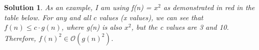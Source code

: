 \documentclass[11pt]{article}
\newtheorem*{solution}{Solution}
\begin{document}
\begin{enumerate}
\begin{solution}
	As an example, I am using f(n) = $x^2$ as demonstrated in red in the table below. 
	For any and all $c$ values (x values), we can see that $f(n) \leq c \cdot g(n)$, where g(n) is also $x^2$, but the c values are 3 and 10.
	Therefore, $f(n)^2 \in \mathcal{O}(g(n)^2)$. 
	\begin{center}
\end{center}
\end{solution}
\end{enumerate}
\end{document}
